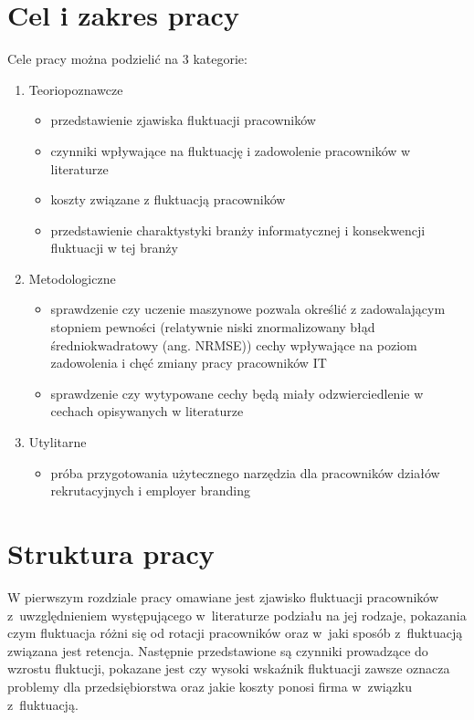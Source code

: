 \section*{Cel i zakres pracy}\label{sec:admission:thesis-goal}

Cele pracy można podzielić na 3 kategorie:
\begin{enumerate}
    \item Teoriopoznawcze
    \begin{itemize}
        \item przedstawienie zjawiska fluktuacji pracowników
        \item czynniki wpływające na fluktuację i zadowolenie pracowników w literaturze
        \item koszty związane z fluktuacją pracowników
        \item przedstawienie charaktystyki branży informatycznej i konsekwencji fluktuacji w tej branży
    \end{itemize}
    \item Metodologiczne
    \begin{itemize}
        \item sprawdzenie czy uczenie maszynowe pozwala określić z zadowalającym stopniem pewności (relatywnie niski znormalizowany błąd średniokwadratowy (ang. NRMSE)) cechy wpływające na poziom zadowolenia i chęć zmiany pracy pracowników IT
        \item sprawdzenie czy wytypowane cechy będą miały odzwierciedlenie w cechach opisywanych w literaturze
    \end{itemize}
    \item Utylitarne
    \begin{itemize}
        \item próba przygotowania użytecznego narzędzia dla pracowników działów rekrutacyjnych i employer branding
    \end{itemize}
\end{enumerate}

\section*{Struktura pracy}\label{sec:admission:thesis-structure}

W pierwszym rozdziale pracy omawiane jest zjawisko fluktuacji pracowników z~uwzględnieniem występującego w~literaturze podziału na jej rodzaje,
pokazania czym fluktuacja różni się od rotacji pracowników oraz w~jaki sposób z~fluktuacją związana jest retencja.
Następnie przedstawione są czynniki prowadzące do wzrostu fluktucji, pokazane jest czy wysoki wskaźnik fluktuacji zawsze oznacza problemy dla przedsiębiorstwa
oraz jakie koszty ponosi firma w~związku z~fluktuacją.


